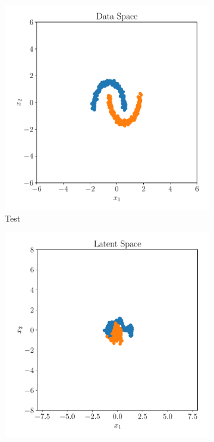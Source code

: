 \begin{figure}[htpb]
    \centering
    \begin{subfigure}[]{0.4\textwidth}
        \centering
    \includegraphics[width=\linewidth]{figures/toy_example/moons/toy_data.pdf}
        \caption{Test}
        \label{fig:moons_sample_space}
    \end{subfigure}
    \begin{subfigure}[]{0.4\textwidth}
        \centering
    \includegraphics[width=\linewidth]{figures/toy_example/moons/latent_space.pdf}

\end{subfigure}
\end{figure}
